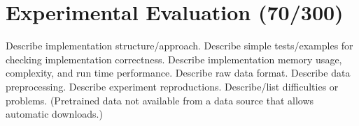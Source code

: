 \section{Experimental Evaluation (70/300)}

Describe implementation structure/approach.
Describe simple tests/examples for checking implementation correctness.
Describe implementation memory usage, complexity, and run time performance.
Describe raw data format.
Describe data preprocessing.
Describe experiment reproductions.
Describe/list difficulties or problems. (Pretrained data not available from a data source that allows automatic downloads.)
